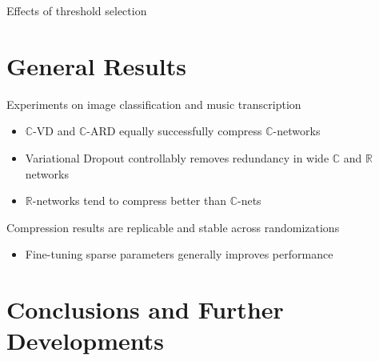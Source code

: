 \documentclass{beamer}
\newcommand{\real}{\mathbb{R}}
\newcommand{\cplx}{\mathbb{C}}
\begin{document}
\begin{frame}[c]{\insertsection}
  Effects of threshold selection
\end{frame}


\section{General Results} %
\label{sec:general_results}

\begin{frame}[c]{\insertsection}
Experiments on image classification and music transcription
\begin{itemize}
  \item $\cplx$-VD and $\cplx$-ARD equally successfully compress $\cplx$-networks
  \smallskip
  \item Variational Dropout controllably removes redundancy in wide $\cplx$ and $\real$ networks
  \smallskip
  \item $\real$-networks tend to compress better than $\cplx$-nets
\end{itemize}

\bigskip
Compression results are replicable and stable across randomizations
\begin{itemize}
  \item Fine-tuning sparse parameters generally improves performance
\end{itemize}
\end{frame}


\section{Conclusions and Further Developments} %
\label{sec:conclusions_and_further_developments}
\end{document}
